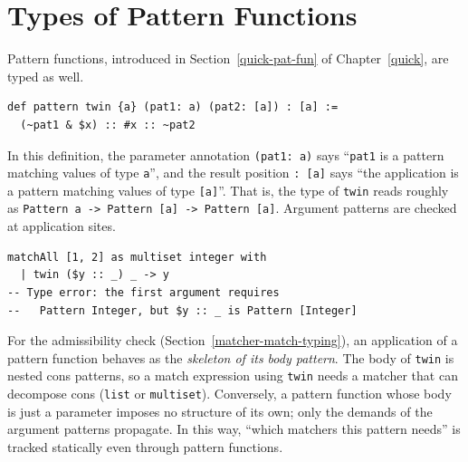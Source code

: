 \section{Types of Pattern Functions}\label{matcher-patfun-types}

Pattern functions, introduced in Section~\ref{quick-pat-fun} of Chapter~\ref{quick}, are typed as well.
\begin{lstlisting}[language=egison,numbers=none]
def pattern twin {a} (pat1: a) (pat2: [a]) : [a] :=
  (~pat1 & $x) :: #x :: ~pat2
\end{lstlisting}
In this definition, the parameter annotation \lstinline{(pat1: a)} says ``\lstinline{pat1} is a pattern matching values of type \lstinline{a}'', and the result position \lstinline{: [a]} says ``the application is a pattern matching values of type \lstinline{[a]}''.
That is, the type of \lstinline{twin} reads roughly as \lstinline{Pattern a -> Pattern [a] -> Pattern [a]}.
Argument patterns are checked at application sites.
\begin{lstlisting}[language=egison,numbers=none]
matchAll [1, 2] as multiset integer with
  | twin ($y :: _) _ -> y
-- Type error: the first argument requires
--   Pattern Integer, but $y :: _ is Pattern [Integer]
\end{lstlisting}

For the admissibility check (Section~\ref{matcher-match-typing}), an application of a pattern function behaves as the \emph{skeleton of its body pattern}.
The body of \lstinline{twin} is nested cons patterns, so a match expression using \lstinline{twin} needs a matcher that can decompose cons (\lstinline{list} or \lstinline{multiset}).
Conversely, a pattern function whose body is just a parameter imposes no structure of its own; only the demands of the argument patterns propagate.
In this way, ``which matchers this pattern needs'' is tracked statically even through pattern functions.
